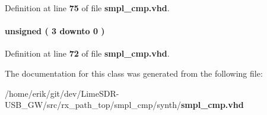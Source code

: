 Definition at line {\bf 75} of file {\bf smpl\+\_\+cmp.\+vhd}.

\paragraph[{wait\+\_\+cnt}]{ {\bfseries \textcolor{comment}{unsigned}\textcolor{vhdlchar}{ }\textcolor{vhdlchar}{(}\textcolor{vhdlchar}{ }\textcolor{vhdlchar}{ } \textcolor{vhdldigit}{3} \textcolor{vhdlchar}{ }\textcolor{keywordflow}{downto}\textcolor{vhdlchar}{ }\textcolor{vhdlchar}{ } \textcolor{vhdldigit}{0} \textcolor{vhdlchar}{ }\textcolor{vhdlchar}{)}\textcolor{vhdlchar}{ }} \hspace{0.3cm}{\ttfamily [Signal]}}\label{classsmpl__cmp_1_1arch_a164e5874734541e1114286dd6da61c5f}


Definition at line {\bf 72} of file {\bf smpl\+\_\+cmp.\+vhd}.



The documentation for this class was generated from the following file\+:\begin{DoxyCompactItemize}
\item 
/home/erik/git/dev/\+Lime\+S\+D\+R-\/\+U\+S\+B\+\_\+\+G\+W/src/rx\+\_\+path\+\_\+top/smpl\+\_\+cmp/synth/{\bf smpl\+\_\+cmp.\+vhd}\end{DoxyCompactItemize}
